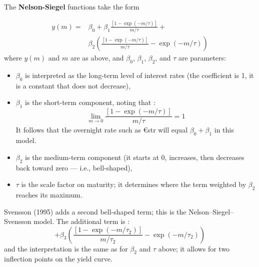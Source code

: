 \begin{f}


The \textbf{Nelson-Siegel} functions take the form

{\small\begin{align*}
y( m ) =& \beta _0 + \beta _1\frac{{\left[ {1 - \exp \left( { - m/\tau} \right)} \right]}}{m/\tau} + \\
		&\beta _2 {\left(\frac{{\left[ {1 - \exp \left( { - m/\tau} \right)} \right]}}{m/\tau} - \exp \left( { - m/\tau}\right)\right)}
\label{MTNSeq}
\end{align*}}
%
where $y\left( m \right)$ and $m$ are as above, and $\beta_0$, $\beta_1$, $\beta_2$, and $\tau$ are parameters:


\begin{itemize}

\item   $\beta_0$ is interpreted as the long-term level of interest rates (the coefficient is 1, it is a constant that does not decrease),

\item   $\beta_1$ is the short-term component, noting that :
\begin{equation*}
	\lim_{m \rightarrow 0} \frac{{\left[ {1 - \exp \left( { - m/\tau} \right)} \right]}}{m/\tau}=1
\end{equation*}
It follows that the overnight rate such as €str will equal $\beta_0 + \beta_1$ in this model.
\item $\beta_2$ is the medium-term component (it starts at 0, increases, then decreases back toward zero — i.e., bell-shaped),
\item $\tau$ is the scale factor on maturity; it determines where the term weighted by $\beta_2$ reaches its maximum.
\end{itemize}

Svensson (1995) adds a second bell-shaped term; this is the Nelson–Siegel–Svensson model. The additional term is :
%
\begin{equation*}
+\beta _3 {\left(\frac{{\left[ {1 - \exp \left( { - m/\tau_2} \right)} \right]}}{m/\tau_2} - \exp \left( { - m/\tau_2}\right)\right)}
\label{MTSveq}
\end{equation*}
and the interpretation is the same as for $\beta_2$ and $\tau$ above; it allows for two inflection points on the yield curve.


\end{f}
